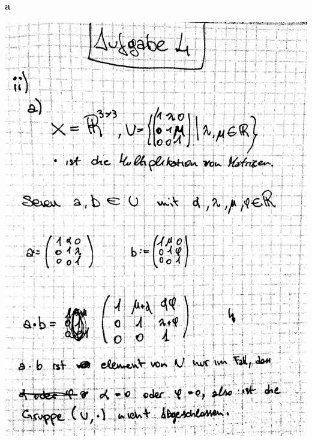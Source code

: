 \documentclass[12pt,a4paper]{article}
\begin{document}
\subsubsection{a}
\includegraphics[scale=0.2]{lat4f_2.jpg} 
\newpage
\end{document}
